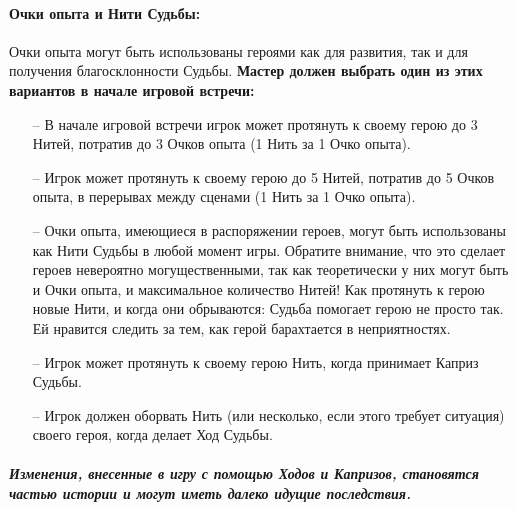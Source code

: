 \paragraph{Очки опыта и Нити Судьбы:} Очки опыта могут быть использованы героями как для развития, так и для получения благосклонности Судьбы. \textbf{Мастер должен выбрать один из этих вариантов в начале игровой встречи:}
\begin{itemize}
\item[--] В начале игровой встречи игрок может протянуть к своему герою до 3 Нитей, потратив до 3 Очков опыта (1 Нить за 1 Очко опыта).
\item[--] Игрок может протянуть к своему герою до 5 Нитей, потратив до 5 Очков опыта, в перерывах между сценами (1 Нить за 1 Очко опыта).
\item[--] Очки опыта, имеющиеся в распоряжении героев, могут быть использованы как Нити Судьбы в любой момент игры. Обратите внимание, что это сделает героев невероятно могущественными, так как теоретически у них могут быть и Очки опыта, и максимальное количество Нитей!
Как протянуть к герою новые Нити, и когда они обрываются:
Судьба помогает герою не просто так. Ей нравится следить за тем, как герой барахтается в неприятностях.
\item[--] Игрок может протянуть к своему герою Нить, когда принимает Каприз Судьбы.
\item[--] Игрок должен оборвать Нить (или несколько, если этого требует ситуация) своего героя, когда делает Ход Судьбы.
\end{itemize}
\paragraph{\textit{Изменения, внесенные в игру с помощью Ходов и Капризов, становятся частью истории и могут иметь далеко идущие последствия.}}